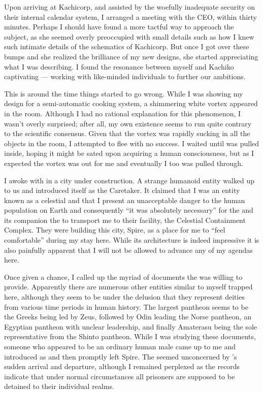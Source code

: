 \documentclass[char]{guardians}
\begin{document}
Upon arriving at Kachicorp, and assisted by the woefully inadequate security on their internal calendar system, I arranged a meeting with the CEO, \cKachiko{} within thirty minutes. Perhaps I should have found a more tactful way to approach the subject, as she seemed overly preoccupied with small details such as how I knew such intimate details of the schematics of Kachicorp. But once I got over these bumps and she realized the brilliance of my new designs, she started appreciating what I was describing. I found the resonance between myself and Kachiko captivating --- working with like-minded individuals to further our ambitions.

This is around the time things started to go wrong. While I was showing \cKachiko{} my design for a semi-automatic cooking system, a shimmering white vortex appeared in the room. Although I had no rational explanation for this phenomenon, I wasn't overly surprised; after all, my own existence seems to run quite contrary to the scientific consensus. Given that the vortex was rapidly sucking in all the objects in the room, I attempted to flee with no success. I waited until \cKachiko{} was pulled inside, hoping it might be sated upon acquiring a human consciousness, but as I expected the vortex was out for me and eventually I too was pulled through.

I awoke with \cKachiko{} in a city under construction. A strange humanoid entity walked up to us and introduced itself as the Caretaker. It claimed that I was an entity known as a celestial and that I present an unacceptable danger to the human population on Earth and consequently ``it was absolutely necessary'' for the \cCaretaker{} and its companion the \cWarden{} to transport me to their facility, the Celestial Containment Complex. They were building this city, Spire, as a place for me to ``feel comfortable'' during my stay here. While its architecture is indeed impressive it is also painfully apparent that I will not be allowed to advance any of my agendas here.

Once given a chance, I called up the myriad of documents the \cCaretaker{} was willing to provide. Apparently there are numerous other entities similar to myself trapped here, although they seem to be under the delusion that they represent deities from various time periods in human history. The largest pantheon seems to be the Greeks being led by Zeus, followed by Odin leading the Norse pantheon, an Egyptian pantheon with unclear leadership, and finally Amaterasu being the sole representative from the Shinto pantheon. While I was studying these documents, someone who appeared to be an ordinary human male came up to me and introduced \cJascha{\themself} as \cJascha{\intro} and then promptly left Spire. The \cWarden{} seemed unconcerned by \cJascha{}'s sudden arrival and departure, although I remained perplexed as the records indicate that under normal circumstances all prisoners are supposed to be detained to their individual realms.
\end{document}
